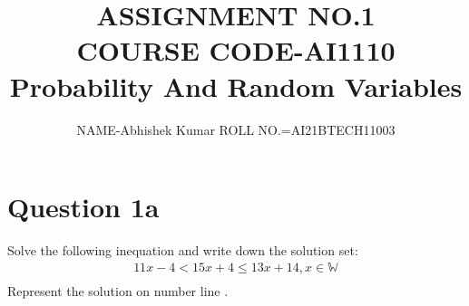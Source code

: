 \documentclass[12pt,two column]{article}
\begin{document}
\title{ASSIGNMENT NO.1  \\COURSE CODE-AI1110\\ Probability And Random Variables }
\author{NAME-Abhishek Kumar ROLL NO.=AI21BTECH11003}
\maketitle
\section*{ Question 1a}
 Solve the following inequation and write down the solution set:\\
\begin{align}
 11x-4 < 15x+4\le13x+14\nonumber,  x\in \mathbb{W}\\\nonumber
\end{align}
Represent the solution on number line .
\end{document}
